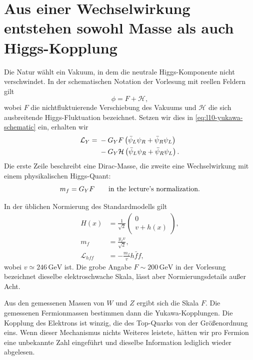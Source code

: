 \section{Aus einer Wechselwirkung entstehen sowohl Masse als auch Higgs-Kopplung}

Die Natur wählt ein Vakuum, in dem die neutrale Higgs-Komponente nicht verschwindet. In der schematischen Notation der Vorlesung mit reellen Feldern gilt
\begin{equation}
  \phi=F+\mathcal H ,
  \label{eq:l10-f-plus-h}
\end{equation}
wobei \(F\) die nichtfluktuierende Verschiebung des Vakuums und \(\mathcal H\) die sich ausbreitende Higgs-Fluktuation bezeichnet. Setzen wir dies in \eqref{eq:l10-yukawa-schematic} ein, erhalten wir
\begin{align}
  \mathcal L_Y
  ={}&
  -G_YF
  \left(\bar\psi_L\psi_R+\bar\psi_R\psi_L\right)
  \notag\\
  &-G_Y\mathcal H
  \left(\bar\psi_L\psi_R+\bar\psi_R\psi_L\right).
  \label{eq:l10-yukawa-split}
\end{align}
Die erste Zeile beschreibt eine Dirac-Masse, die zweite eine Wechselwirkung mit einem physikalischen Higgs-Quant:
\begin{equation}
  m_f=G_YF
  \qquad\hbox{in the lecture's normalization.}
  \label{eq:l10-mass-lecture-normalization}
\end{equation}

In der üblichen Normierung des Standardmodells gilt
\begin{equation}
\begin{aligned}
  H(x)&=\frac{1}{\sqrt2}
  \begin{pmatrix}
    0\\ v+h(x)
  \end{pmatrix},
  \\
  m_f&=\frac{y_fv}{\sqrt2},
  \\
  \mathcal L_{hff}&=-\frac{m_f}{v}h\bar f f,
\end{aligned}
  \label{eq:l10-standard-higgs-normalization}
\end{equation}
wobei \(v\simeq246\,\mathrm{GeV}\) ist. Die grobe Angabe \(F\sim200\,\mathrm{GeV}\) in der Vorlesung bezeichnet dieselbe elektroschwache Skala, lässt aber Normierungsdetails außer Acht.

Aus den gemessenen Massen von \(W\) und \(Z\) ergibt sich die Skala \(F\). Die gemessenen Fermionmassen bestimmen dann die Yukawa-Kopplungen. Die Kopplung des Elektrons ist winzig, die des Top-Quarks von der Größenordnung eins. Wenn dieser Mechanismus nichts Weiteres leistete, hätten wir pro Fermion eine unbekannte Zahl eingeführt und dieselbe Information lediglich wieder abgelesen.

